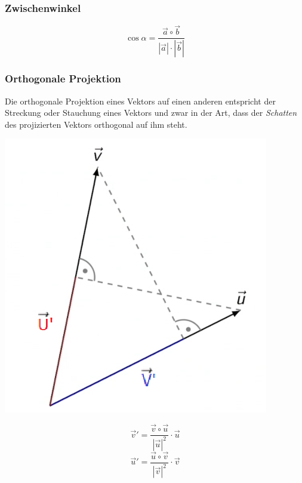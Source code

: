 \subsubsection{Zwischenwinkel}
\[\cos{\alpha} = \frac{\vec{a} \circ \vec{b}}{|\vec{a}| \cdot |\vec{b}|}\]

\subsubsection{Orthogonale Projektion}
Die orthogonale Projektion eines Vektors auf einen anderen entspricht der Streckung oder Stauchung eines Vektors und zwar in der Art, dass der \textit{Schatten} des projizierten Vektors orthogonal auf ihm steht.

\begin{center}
	\begin{minipage}{0.20\textwidth}
		\includegraphics[width=\linewidth,keepaspectratio=true]{./Images/skalarprojektion.png}
	\end{minipage}%
	\begin{minipage}{0.2\textwidth}
		\[\vec{v}' = \frac{\vec{v} \circ \vec{u}}{\left|\vec{u}\right|^2} \cdot \vec{u}\]
		\[\vec{u}' = \frac{\vec{u} \circ \vec{v}}{\left|\vec{v}\right|^2} \cdot \vec{v}\]
	\end{minipage}
\end{center}

